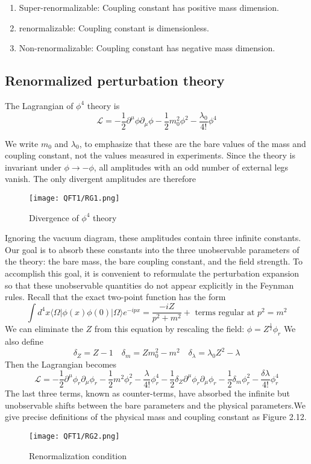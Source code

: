 \begin{enumerate}
\item Super-renormalizable: Coupling constant has positive mass dimension.
\item  renormalizable: Coupling constant is dimensionless.
\item  Non-renormalizable: Coupling constant has negative mass dimension.
\end{enumerate}

\subsection{Renormalized perturbation theory}
The Lagrangian of $\phi^4$ theory is 
\[\mathcal{L} = -\frac{1}{2} \partial^{\mu} \phi \partial_{\mu} \phi -\frac{1}{2}m_0^2 \phi^2 - \frac{\lambda_0}{4!}\phi^4\]

We write $m_0$ and $\lambda_0$, to emphasize that these are the bare values of the mass and coupling constant, not the values measured in experiments.
Since the theory is invariant under $\phi \to -\phi$, all amplitudes with an odd number of external legs vanish. The only divergent amplitudes are therefore
\begin{figure}[!h]
\centering
\texttt{[image: QFT1/RG1.png]}
\caption{Divergence of $\phi^4$ theory}
\end{figure}

Ignoring the vacuum diagram, these amplitudes contain three infinite constants. Our goal is to absorb these constants into the three unobservable parameters of the theory: the bare mass, the bare coupling constant, and the field strength. To accomplish this goal, it is convenient to reformulate the perturbation expansion so that these unobservable quantities do not appear
explicitly in the Feynman rules. Recall that the exact two-point function has the form
\[\int d^4x \langle \Omega | \phi(x) \phi(0) | \Omega \rangle e^{-ipx} = \frac{-iZ}{p^2+m^2} + \mbox{ terms regular at } p^2 = m^2\]
We can eliminate the $Z$ from this equation by rescaling the field:
$\phi = Z^{\frac{1}{2}} \phi_r$
We also define
\[\delta_Z = Z -1 \quad \delta_m = Zm_0^2 - m^2 \quad \delta_{\lambda} = \lambda_0 Z^2 - \lambda\]
Then the Lagrangian becomes
\[\mathcal{L} = -\frac{1}{2} \partial^{\mu} \phi_r \partial_{\mu} \phi_r -\frac{1}{2}m^2 \phi_r^2 - \frac{\lambda}{4!}\phi_r^4 -\frac{1}{2} \delta_Z \partial^{\mu} \phi_r \partial_{\mu} \phi_r -\frac{1}{2}\delta_m \phi_r^2 - \frac{\delta \lambda}{4!}\phi_r^4\]
The last three terms, known as counter-terms, have absorbed the infinite but unobservable shifts between the bare parameters and the physical parameters.We give precise definitions of the physical mass and coupling constant as Figure 2.12.\\
\begin{figure}[!h]
\centering
\texttt{[image: QFT1/RG2.png]}
\caption{Renormalization condition}
\end{figure}

